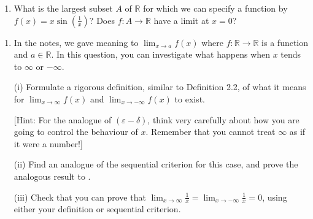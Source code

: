 \documentclass[letterpaper,10pt,english]{jupyterBook}
\begin{document}
\label{\detokenize{Problems:id10}}\begin{enumerate}
%
\setcounter{enumi}{9}
\item {} 
\sphinxAtStartPar
What is the largest subset \(A\) of \(\mathbb{R}\) for which we can specify a function by \(f(x) = x\sin\left(\frac{1}{x}\right)\)? Does \(f:A\to\mathbb{R}\)  have a limit at \(x = 0\)?

\end{enumerate}
\label{\detokenize{Problems:id11}}\begin{enumerate}
%
\setcounter{enumi}{10}
\item {} 
\sphinxAtStartPar
In the notes, we gave meaning to \(\displaystyle\lim_{x \rightarrow a} f(x)\) where \(f:\mathbb{R} \rightarrow \mathbb{R}\) is a function and \(a \in \mathbb{R}\). In this question, you can investigate what happens when \(x\) tends to \(\infty\) or \(-\infty\).

\sphinxAtStartPar
(i) Formulate a rigorous definition, similar to Definition 2.2, of what it means for \(\displaystyle\lim_{x \rightarrow \infty}f(x)\) and \(\displaystyle\lim_{x \rightarrow -\infty}f(x)\) to exist.

{[}Hint: For the analogue of \((\varepsilon-\delta)\), think very carefully about how you are going to control the behaviour of \(x\). Remember that you cannot treat \(\infty\) as if it were a number!{]}

\sphinxAtStartPar
(ii) Find an analogue of the sequential criterion for this case, and prove the analogous result to .

\sphinxAtStartPar
(iii) Check that you can prove that \(\displaystyle\lim_{x \rightarrow \infty}\frac{1}{x} = \lim_{x \rightarrow -\infty}\frac{1}{x} = 0\), using either your definition or sequential criterion.

\end{enumerate}
\end{document}
